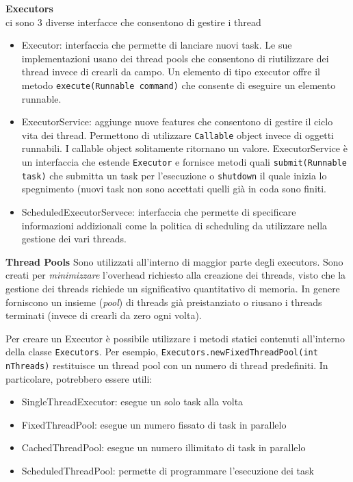 \documentclass{article}
\begin{document}
\textbf{Executors}\\
ci sono 3 diverse interfacce che consentono di gestire i thread
\begin{itemize}
\item Executor: interfaccia che permette di lanciare nuovi task. Le sue implementazioni usano dei thread pools che consentono di riutilizzare dei thread invece di crearli da campo. Un elemento di tipo executor offre il metodo \texttt{execute(Runnable command)} che consente di eseguire un elemento runnable. 
\item ExecutorService: aggiunge nuove features che consentono di gestire il ciclo vita dei thread. Permettono di utilizzare \texttt{Callable} object invece di oggetti runnabili. I callable object solitamente ritornano un valore. ExecutorService \`e un interfaccia che estende \texttt{Executor} e fornisce metodi quali \texttt{submit(Runnable task)} che submitta un task per l'esecuzione o \texttt{shutdown} il quale inizia lo spegnimento (nuovi task non sono accettati quelli gi\`a in coda sono finiti.
\item ScheduledExecutorServece: interfaccia che permette di specificare informazioni addizionali come la politica di scheduling da utilizzare nella gestione dei vari threads.
\end{itemize}

\textbf{Thread Pools}
Sono utilizzati all'interno di maggior parte degli executors. Sono creati per \emph{minimizzare} l'overhead richiesto alla creazione dei threads, visto che la gestione dei threads richiede un significativo quantitativo di memoria. In genere forniscono un insieme (\emph{pool}) di threads gi\`a preistanziato o riusano i threads terminati (invece di crearli da zero ogni volta).

Per creare un Executor \`e possibile utilizzare i metodi statici contenuti all'interno della classe \texttt{Executors}. Per esempio, \texttt{Executors.newFixedThreadPool(int nThreads)} restituisce un thread pool con un numero di thread predefiniti. In particolare, potrebbero essere utili:
\begin{itemize}
\item SingleThreadExecutor: esegue un solo task alla volta
\item FixedThreadPool: esegue un numero fissato di task in parallelo
\item CachedThreadPool: esegue un numero illimitato di task in parallelo
\item ScheduledThreadPool: permette di programmare l'esecuzione dei task
\end{itemize}
\end{document}
